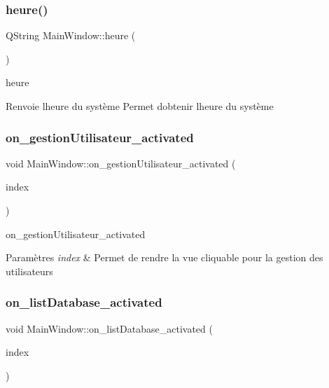 \subsubsection{\texorpdfstring{heure()}{heure()}}
{\footnotesize\ttfamily Q\+String Main\+Window\+::heure (\begin{DoxyParamCaption}{ }\end{DoxyParamCaption})}



heure 

\begin{DoxyReturn}{Renvoie}
l\textquotesingle{}heure du système Permet d\textquotesingle{}obtenir l\textquotesingle{}heure du système 
\end{DoxyReturn}
\mbox{\label{class_main_window_a9c3a8c1df5ed2f93b79333aeab5a3323}} 
\subsubsection{\texorpdfstring{on\+\_\+gestion\+Utilisateur\+\_\+activated}{on\_gestionUtilisateur\_activated}}
{\footnotesize\ttfamily void Main\+Window\+::on\+\_\+gestion\+Utilisateur\+\_\+activated (\begin{DoxyParamCaption}\item[{const Q\+Model\+Index \&}]{index }\end{DoxyParamCaption})\hspace{0.3cm}{\ttfamily [slot]}}



on\+\_\+gestion\+Utilisateur\+\_\+activated 


\begin{DoxyParams}{Paramètres}
{\em index} & Permet de rendre la vue cliquable pour la gestion des utilisateurs \\
\hline
\end{DoxyParams}
\mbox{\label{class_main_window_a37382033fa3cefb818a17d198707abe1}} 
\subsubsection{\texorpdfstring{on\+\_\+list\+Database\+\_\+activated}{on\_listDatabase\_activated}}
{\footnotesize\ttfamily void Main\+Window\+::on\+\_\+list\+Database\+\_\+activated (\begin{DoxyParamCaption}\item[{const Q\+Model\+Index \&}]{index }\end{DoxyParamCaption})\hspace{0.3cm}{\ttfamily [slot]}}



